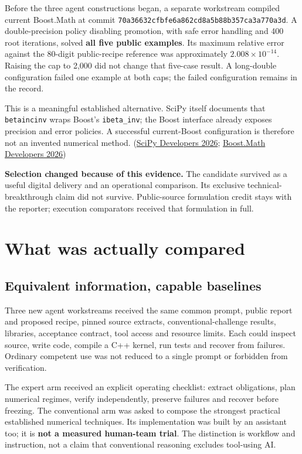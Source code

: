 \documentclass[
  10pt,
]{article}
\newcommand{\editionbreak}{\par\bigskip\Needspace{8\baselineskip}}
\begin{document}
Before the three agent constructions began, a separate workstream
compiled current Boost.Math at commit
\texttt{70a36632cfbfe6a862cd8a5b88b357ca3a770a3d}. A double-precision
policy disabling promotion, with safe error handling and 400 root
iterations, solved \textbf{all five public examples}. Its maximum
relative error against the 80-digit public-recipe reference was
approximately \(2.008\times10^{-14}\). Raising the cap to 2,000 did not
change that five-case result. A long-double configuration failed one
example at both caps; the failed configuration remains in the record.

This is a meaningful established alternative. SciPy itself documents
that \texttt{betaincinv} wraps Boost's \texttt{ibeta\_inv}; the Boost
interface already exposes precision and error policies. A successful
current-Boost configuration is therefore not an invented numerical
method. (\protect\hyperlink{ref-scipydocs}{SciPy Developers 2026};
\protect\hyperlink{ref-boost}{Boost.Math Developers 2026})

\textbf{Selection changed because of this evidence.} The candidate
survived as a useful digital delivery and an operational comparison. Its
exclusive technical-breakthrough claim did not survive. Public-source
formulation credit stays with the reporter; execution comparators
received that formulation in full.

\editionbreak

\hypertarget{what-was-actually-compared}{%
\section{What was actually compared}\label{what-was-actually-compared}}

\hypertarget{equivalent-information-capable-baselines}{%
\subsection{Equivalent information, capable
baselines}\label{equivalent-information-capable-baselines}}

Three new agent workstreams received the same common prompt, public
report and proposed recipe, pinned source extracts,
conventional-challenge results, libraries, acceptance contract, tool
access and resource limits. Each could inspect source, write code,
compile a C++ kernel, run tests and recover from failures. Ordinary
competent use was not reduced to a single prompt or forbidden from
verification.

The expert arm received an explicit operating checklist: extract
obligations, plan numerical regimes, verify independently, preserve
failures and recover before freezing. The conventional arm was asked to
compose the strongest practical established numerical techniques. Its
implementation was built by an assistant too; it is \textbf{not a
measured human-team trial}. The distinction is workflow and instruction,
not a claim that conventional reasoning excludes tool-using AI.
\end{document}
